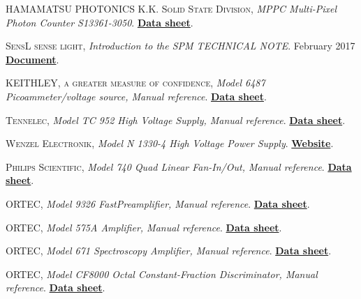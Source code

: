 \begin{thebibliography}{100}
 \textsc{HAMAMATSU PHOTONICS K.K. Solid State Division},
\textit{MPPC Multi-Pixel Photon Counter S13361-3050}. \href{https://www.hamamatsu.com/jp/en/product/type/S13361-3050AE-08/index.html}{\textbf{Data sheet}}.

 \textsc{SensL sense light},
\textit{Introduction to the SPM TECHNICAL NOTE}. February 2017 \href{https://sensl.com/}{\textbf{Document}}.

 \textsc{KEITHLEY, a greater measure of confidence},
\textit{Model 6487 Picoammeter/voltage source, Manual reference}. \href{https://pdf.directindustry.com/pdf/keithley-instruments/6487-picoammeter-voltage-source/1438-619876.html}{\textbf{Data sheet}}.

 \textsc{Tennelec},
\textit{Model TC 952 High Voltage Supply, Manual reference}. \href{https://groups.nscl.msu.edu/nscl_library/manuals/tennelec/tennelec.htm}{\textbf{Data sheet}}.

 \textsc{Wenzel Electronik},
\textit{Model N 1330-4 High Voltage Power Supply}. \href{https://wenzel-elektronik.de}{\textbf{Website}}.

 \textsc{Philips Scientific},
\textit{Model 740 Quad Linear Fan-In/Out, Manual reference}. \href{https://prep.fnal.gov/catalog/hardware_info/phillips_scientific/740.html}{\textbf{Data sheet}}.

 \textsc{ORTEC},
\textit{Model 9326 FastPreamplifier, Manual reference}. \href{https://www.ortec-online.com/products/electronics/preamplifiers/9326}{\textbf{Data sheet}}.

 \textsc{ORTEC},
\textit{Model 575A Amplifier, Manual reference}. \href{https://www.ortec-online.com/products/electronics/amplifiers/575a}{\textbf{Data sheet}}.

 \textsc{ORTEC},
\textit{Model 671 Spectroscopy Amplifier, Manual reference}. \href{https://www.ortec-online.com/products/electronics/amplifiers/671}{\textbf{Data sheet}}.

 \textsc{ORTEC},
\textit{Model CF8000 Octal Constant-Fraction Discriminator, Manual reference}. \href{https://www.ortec-online.com/products/electronics/fast-timing-discriminators/cf8000}{\textbf{Data sheet}}.


\end{thebibliography}
